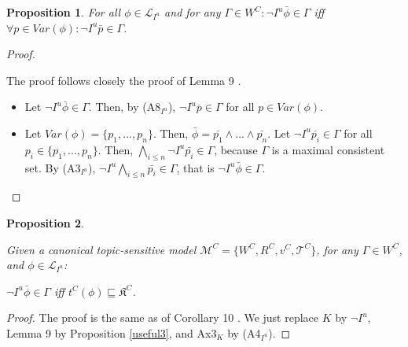 \documentclass{article}
\newtheorem{prop}{Proposition}
\begin{document}
\begin{prop}

For all $\phi \in \mathcal{L}_{I^{u}}$ and for any $\Gamma \in W^{C}: \neg I^{u} \bar{\phi} \in \Gamma$ iff $\forall p \in Var(\phi): \neg I^{u} \bar{p} \in \Gamma$. 

\end{prop}



\begin{proof}
\label{useful3}

The proof follows closely the proof of Lemma 9 \citep{Ozgun2023}.

\begin{itemize}

\item[$(\Rightarrow)$] Let $\neg I^{u} \bar{\phi} \in \Gamma$. Then, by (A8$_{I^{u}}$), $\neg I^{u} \overline{p} \in \Gamma$ for all $p \in Var(\phi)$.



\item[$(\Leftarrow)$] Let $Var(\phi) = \{p_{1}, ..., p_{n}\}$. Then, $\bar{\phi} = \bar{p_{1}} \wedge ... \wedge \bar{p_{n}}$. Let $\neg I^{u} \bar{p_{i}} \in \Gamma$ for all $p_{i} \in \{p_{1}, ..., p_{n}\}$. Then, $\bigwedge_{i \leq n} \neg I^{u} \bar{p_{i}} \in \Gamma$, because $\Gamma$ is a maximal consistent set. By (A3$_{I^{u}}$), $\neg I^{u} \bigwedge_{i \leq n} \bar{p_{i}} \in \Gamma$, that is $\neg I^{u} \bar{\phi} \in \Gamma$.

\end{itemize}



\end{proof}





\begin{prop}
\label{useful4}

Given a canonical topic-sensitive model $\mathcal{M}^{C} = \{W^{C}, R^{C}, v^{C}, \mathcal{T}^{C}\}$, for any $\Gamma \in W^{C}$, and $\phi \in \mathcal{L}_{I^{u}}$:

\begin{center}

$\neg I^{u} \bar{\phi} \in \Gamma$ iff $t^{C}(\phi) \sqsubseteq \mathfrak{K}^{C}$.

\end{center}

\end{prop}

\begin{proof}
The proof is the same as of Corollary 10 \citep{Ozgun2023}. We just replace $K$ by $\neg I^{u}$, Lemma 9 by Proposition \ref{useful3}, and Ax3$_{K}$ by (A4$_{I^{u}}$).

\end{proof}
\end{document}
